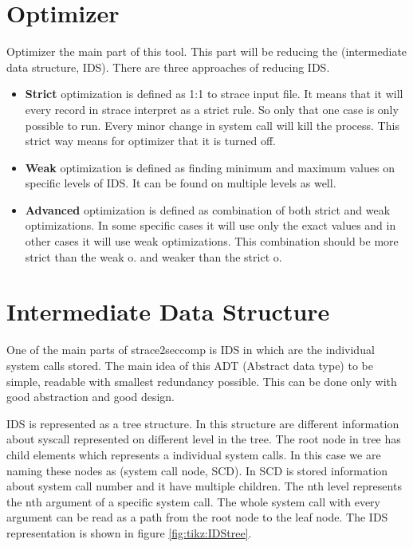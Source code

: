 \section{Optimizer}
Optimizer the main part of this tool.
This part will be reducing the (intermediate data structure, IDS).
There are three approaches of reducing IDS.
\begin{itemize}
  \item \textbf{Strict} optimization is defined as 1:1 to strace input file. It means that it will every record in strace interpret as a strict rule. So only that one case is only possible to run. Every minor change in system call will kill the process. This strict way means for optimizer that it is turned off.

  \item \textbf{Weak} optimization is defined as finding minimum and maximum values on specific levels of IDS. It can be found on multiple levels as well.

  \item \textbf{Advanced} optimization is defined as combination of both strict and weak optimizations. In some specific cases it will use only the exact values and in other cases it will use weak optimizations. This combination should be more strict than the weak o. and weaker than the strict o.
\end{itemize}


\section{Intermediate Data Structure}
One of the main parts of strace2seccomp is IDS in which are the individual system calls stored.
The main idea of this ADT (Abstract data type) to be simple, readable with smallest redundancy possible.
This can be done only with good abstraction and good design.

IDS is represented as a tree structure.
In this structure are different information about syscall represented on different level in the tree.
The root node in tree has child elements which represents a individual system calls.
In this case we are naming these nodes as (system call node, SCD).
In SCD is stored information about system call number and it have multiple children.
The nth level represents the nth argument of a specific system call.
The whole system call with every argument can be read as a path from the root node to the leaf node.
The IDS representation is shown in figure \ref{fig:tikz:IDStree}.

